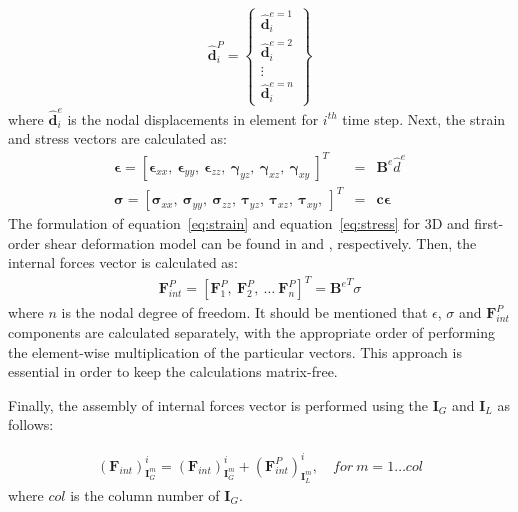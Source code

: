 \begin{eqnarray}
	\widehat{\textbf{d}}_i^P = \left\{ \begin{array}{c}
		\widehat{\textbf{d}}_i^{e=1}\\
		\widehat{\textbf{d}}_i^{e=2}\\
		\vdots\\
		\widehat{\textbf{d}}_i^{e=n} \end{array}\right\}
\end{eqnarray}
where $\widehat{\textbf{d}}_i^e$ is the nodal displacements in element for $i^{th}$ time step.
Next, the strain and stress vectors are calculated as:
\begin{eqnarray}
	\label{eq:strain}
	\boldsymbol{\epsilon}=\left[\boldsymbol{\epsilon}_{xx},\ \boldsymbol{\epsilon}_{yy},\ \boldsymbol{\epsilon}_{zz},\ \boldsymbol{\gamma}_{yz},\ \boldsymbol{\gamma}_{xz},\ \boldsymbol{\gamma}_{xy}\ \right]^T&=&\textbf{B}^e\widehat{d}^e\\
	\label{eq:stress}
	\boldsymbol{\sigma}=\left[\boldsymbol{\sigma}_{xx},\ \boldsymbol{\sigma}_{yy},\ \boldsymbol{\sigma}_{zz},\ \boldsymbol{\tau}_{yz},\ \boldsymbol{\tau}_{xz},\ \boldsymbol{\tau}_{xy},\ \right]^T&=&\textbf{c}\boldsymbol{\epsilon}
\end{eqnarray}
The formulation of equation~\ref{eq:strain} and equation~\ref{eq:stress} for 3D and first-order shear deformation model can be found in \cite{kudela2016parallel} and \cite{kudela2020parallel}, respectively.
Then, the internal forces vector is calculated as:
\begin{eqnarray}
	\label{eq:forces}
	\textbf{F}^P_{int}=\left[\textbf{F}^P_1,\ \textbf{F}^P_2,\ \ldots\ \textbf{F}^P_{n} \right]^T={\textbf{B}^e}^T\sigma
\end{eqnarray}
where $n$ is the nodal degree of freedom.
It should be mentioned that $\epsilon$, $\sigma$ and $\textbf{F}^P_{int}$ components are calculated separately, with the appropriate order of performing the element-wise multiplication of the particular vectors.
This approach is essential in order to keep the calculations matrix-free.

Finally, the assembly of internal forces vector is performed using the $\textbf{I}_G$ and $\textbf{I}_L$ as follows:

\begin{eqnarray}
	\label{eq:Fint}
	{\left(\textbf{F}_{int}\right)}^i_{\textbf{I}^m_G} = {\left(\textbf{F}_{int}\right)}^i_{\textbf{I}^m_G} + {\left(\textbf{F}^P_{int}\right)}^i_{\textbf{I}^m_L},\quad for\ m=1\ldots col 
\end{eqnarray}
where $col$ is the column number of $\textbf{I}_G$.

